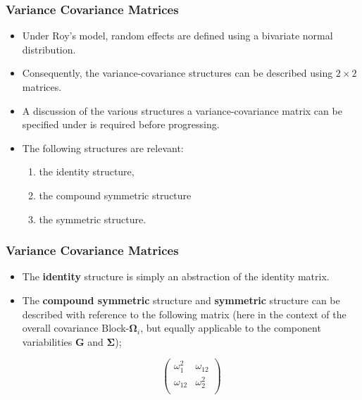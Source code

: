 \documentclass[compress]{beamer}        %
\begin{document}
\begin{frame}
\frametitle{Variance Covariance Matrices }
\large
\begin{itemize}\itemsep0.4cm
\item Under Roy's model, random effects are defined using a bivariate normal distribution. 
\item Consequently, the variance-covariance structures can be described using $2 \times 2$  matrices. \item A discussion of the various structures a variance-covariance matrix can be specified under is required before progressing. 
\item The following structures are relevant:
\begin{enumerate}
\item the identity structure, 
\item the compound symmetric structure
\item the symmetric structure.
\end{enumerate}
\end{itemize}
\end{frame}
\begin{frame}
\frametitle{Variance Covariance Matrices }
\begin{itemize}
\item The \textbf{identity} structure is simply an abstraction of the identity matrix. 
\item The \textbf{compound symmetric} structure and \textbf{symmetric} structure can be described with reference to the following matrix (here in the context of the overall covariance Block-$\boldsymbol{\Omega}_i$, but equally applicable to the component variabilities $\boldsymbol{G}$ and $\boldsymbol{\Sigma}$);

\[\left( \begin{array}{cc}
              \omega^2_1  & \omega_{12} \\
              \omega_{12} & \omega^2_2 \\
\end{array}\right) \]
\end{itemize}
\end{frame}

\end{document}

